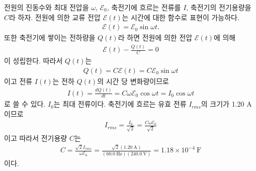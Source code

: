 \documentclass[tightenlines,floatfix,nofootinbib,superscriptaddress,fleqn]{revtex4}
\begin{document}
전원의 진동수와 최대 전압을 $\omega$, $\mathcal{E}_0$, 축전기에 흐르는 전류를 
$I$, 축전기의 전기용량을 $C$라 하자. 전원에 의한 교류 전압 $\mathcal{E}(t)$는
시간에 대한 함수로 표현이 가능하다.
\begin{align}
  \mathcal{E}(t) = \mathcal{E}_0\sin\omega t.
\end{align} 
또한 축전기에 쌓이는 전하량을 $Q(t)$라 하면 전원에 의한 전압 $\mathcal{E}(t)$에
의해
\begin{align}
  \mathcal{E}(t) - \frac{Q(t)}{C} = 0 
\end{align}
이 성립한다. 따라서 $Q(t)$는
\begin{align}
  Q(t) = C\mathcal{E}(t) = C\mathcal{E}_0\sin\omega t
\end{align}
이고 전류 $I(t)$는 전하 $Q(t)$의 시간 당 변화량이므로
\begin{align}\label{eq:2-1}
  I(t) = \frac{dQ(t)}{dt} = C\omega\mathcal{E}_0\cos\omega t = I_0\cos\omega t
\end{align}
로 쓸 수 있다. $I_0$는 최대 전류이다. 축전기에 흐르는 유효 전류 $I_{rms}$의 크기가
1.20 A이므로
\begin{align}
  I_{rms} = \frac{I_0}{\sqrt{2}}=\frac{C\omega \mathcal{E}_0}{\sqrt{2}}
\end{align}
이고 따라서 전기용량 $C$는
\begin{align}
  C = \frac{\sqrt{2}I_{rms}}{\omega \mathcal{E}_0}
  =\frac{\sqrt{2}(1.20~\mathrm{A})}{(60.0~\mathrm{Hz})(240.0~\mathrm{V})}
  =1.18\times 10^{-4}~\mathrm{F}
\end{align}
이다.
\vspace{1cm}
\end{document}
